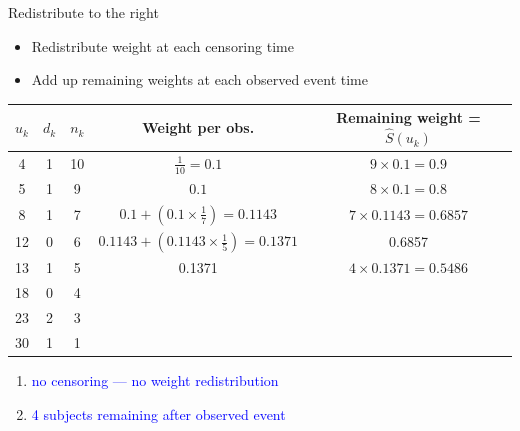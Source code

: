 \documentclass[10pt,t]{beamer}
\begin{document}
\begin{frame}{Redistribute to the right}
	\begin{itemize}
		\item Redistribute weight at each censoring time
		\item Add up remaining weights at each observed event time
	\end{itemize}
	\begin{footnotesize}
		\begin{tabular}{|c|c|c|c|c|}
			\hline
			$u_k$ & $d_k$ & $n_k$ & Weight per obs. & Remaining weight = $\widehat{S}(u_k)$ \\
			\hline
			4 & 1 & 10 & $\frac{1}{10} = 0.1$ & $9\times 0.1= 0.9$\\
			5 & 1 & 9 & $0.1$ &  $8\times 0.1= 0.8$  \\
			8 & 1 & 7 & $0.1 + (0.1\times \frac{1}{7}) = 0.1143$ & $7 \times 0.1143 = 0.6857$\\
			12 & 0 & 6 & $0.1143 +  (0.1143\times\frac{1}{5}) = 0.1371$ &  0.6857\\
			13 & 1 & 5 & 0.1371 & $4 \times 0.1371 =0.5486 $\\
			18 & 0 & 4 & & \\
			23 & 2 & 3 & & \\
			30 & 1 & 1 & & \\
			\hline
		\end{tabular}
	\end{footnotesize}
	\begin{enumerate}
		\item \textcolor{blue}{no censoring --- no weight redistribution}
		\item \textcolor{blue}{4 subjects remaining after observed event}
	\end{enumerate}
\end{frame}
\end{document}
